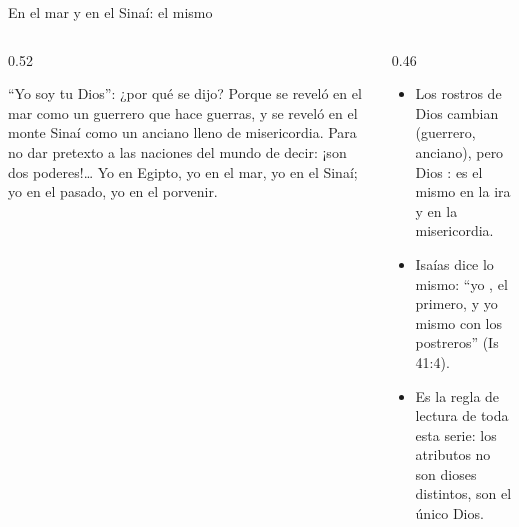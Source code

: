 \begin{frame}{En el mar y en el Sinaí: el mismo}
\begin{columns}[t,onlytextwidth]
\begin{column}{0.52\textwidth}
\begin{cita}[colback=dorado!10!papiro,colframe=dorado!80!azul,fontupper=\scriptsize\itshape]``Yo soy \SENOR{} tu Dios'': ¿por qué se dijo? Porque se reveló en el mar como un guerrero que hace guerras, y se reveló en el monte Sinaí como un anciano lleno de misericordia. Para no dar pretexto a las naciones del mundo de decir: ¡son dos poderes!\ldots{} Yo en Egipto, yo en el mar, yo en el Sinaí; yo en el pasado, yo en el porvenir.\end{cita}
\end{column}
\begin{column}{0.46\textwidth}\small
\begin{itemize}
\item Los rostros de Dios cambian (guerrero, anciano), pero Dios : es el mismo en la ira y en la misericordia.
\item Isaías dice lo mismo: ``yo \SENOR, el primero, y yo mismo con los postreros'' (Is 41:4).
\item Es la regla de lectura de toda esta serie: los atributos no son dioses distintos, son el único Dios.
\end{itemize}
\end{column}
\end{columns}
\end{frame}

